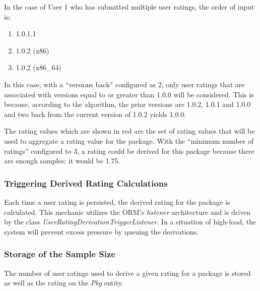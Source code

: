 In the case of User 1 who has submitted multiple user ratings, the order of input is;

\begin{enumerate}
\item 1.0.1.1
\item 1.0.2 (x86)
\item 1.0.2 (x86\_64)
\end{enumerate}

In this case, with a ``versions back'' configured as 2, only user ratings that are associated with versions equal to or greater than 1.0.0 will be considered.  This is because, according to the algorithm, the prior versions are 1.0.2, 1.0.1 and 1.0.0 and two back from the current version of 1.0.2 yields 1.0.0.

The rating values which are shown in {\color{red} red} are the set of rating values that will be used to aggregate a rating value for the package.  With the ``minimum number of ratings'' configured to 3, a rating could be derived for this package because there are enough samples; it would be 1.75.

\subsubsection{Triggering Derived Rating Calculations}

Each time a user rating is persisted, the derived rating for the package is calculated.  This mechanic utilizes the ORM's {\it listener} architecture and is driven by the class {\it UserRatingDerivationTriggerListener}.  In a situation of high-load, the system will prevent excess pressure by queuing the derivations.

\subsubsection{Storage of the Sample Size}

The number of user ratings used to derive a given rating for a package is stored as well as the rating on the {\it Pkg} entity.